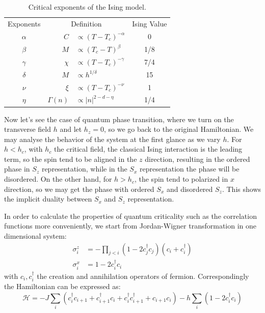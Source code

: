 \documentclass{article}
\theoremstyle{plain} \newtheorem{thm}{Theorem}[section]
\theoremstyle{definition} \newtheorem{df}{Definition}[section]
\theoremstyle{definition} \newtheorem{eg}{Example}
\theoremstyle{remark} \newtheorem*{rmk}{Remark}
\begin{document}
\begin{table}[htpb]
  \centering
  \caption{Critical exponents of the Ising model.}
  \label{tab:critical_exponents}
  \begin{tabular}{crlc}
    \toprule
    Exponents & \multicolumn{2}{c}{Definition} & Ising Value \\
    $\alpha$ & $C$ & $ \propto (T-T_c)^{-\alpha}$ & 0 \\
    $\beta$ & $M$ & $ \propto (T_c-T)^\beta$ & 1/8 \\
    $\gamma$ & $\chi$ & $ \propto (T-T_c)^{-\gamma}$ & 7/4 \\
    $\delta$ & $M$ & $ \propto h^{1/\delta}$ & 15 \\
    \midrule
    $\nu$ & $\xi$ & $ \propto (T-T_c)^{-\nu}$ & 1 \\
    $\eta$ & $\varGamma(n)$ & $ \propto |n|^{2-d-\eta}$ & 1/4 \\
    \bottomrule
  \end{tabular}
\end{table}

	Now let's see the case of quantum phase transition, where we turn on the transverse field $h$ and let $h_z=0$, so we go back to the original Hamiltonian. We may analyse the behavior of the system at the first glance as we vary $h$. For $h<h_c$, with $h_c$ the critical field, the classical Ising interaction is the leading term, so the spin tend to be aligned in the $z$ direction, resulting in the ordered phase in $S_z$ representation, while in the $S_x$ representation the phase will be disordered. On the other hand, for $h>h_c$, the spin tend to polarized in $x$ direction, so we may get the phase with ordered $S_x$ and disordered $S_z$. This shows the implicit duality between $S_x$ and $S_z$ representation.
	
	In order to calculate the properties of quantum criticality such as the correlation functions more conveniently, we start from Jordan-Wigner transformation in one dimensional system:
	\begin{equation}
		\begin{align}
		\sigma_i^z&=-\prod_{j<i}(1-2c_j^{\dagger}c_j)(c_i+c_i^{\dagger})\\
		\sigma_i^x&=1-2c_i^{\dagger}c_i
		\end{align}
	\end{equation}
	with $c_i,c_i^{\dagger}$ the creation and annihilation operators of fermion. Correspondingly the Hamiltonian can be expressed as:
	\begin{equation}
		\mathcal{H}=-J\sum_i(c_i^{\dagger}c_{i+1}+c_{i+1}^{\dagger}c_i+c_i^{\dagger}c_{i+1}^{\dagger}+c_{i+1}c_i)-h\sum_i(1-2c_i^{\dagger}c_i)
	\end{equation}
	
\end{document}
